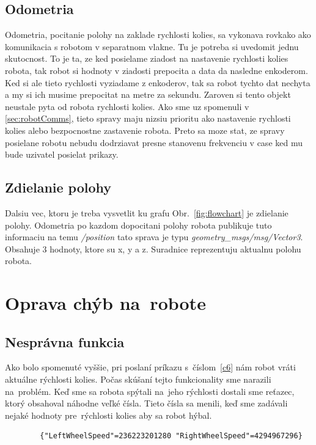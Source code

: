 \subsection{Odometria}
\label{sec:odometria}

Odometria, pocitanie polohy na zaklade rychlosti kolies, sa vykonava rovkako ako komunikacia s robotom v separatnom vlakne. Tu je potreba si uvedomit
jednu skutocnost. To je ta, ze ked posielame ziadost na nastavenie rychlosti kolies robota, tak robot si hodnoty v ziadosti prepocita a data da nasledne
enkoderom. Ked si ale tieto rychlosti vyziadame z enkoderov, tak sa robot tychto dat nechyta a my si ich musime prepocitat na metre za sekundu. Zaroven
si tento objekt neustale pyta od robota rychlosti kolies. Ako sme uz spomenuli v \ref{sec:robotComms}, tieto spravy maju nizsiu prioritu ako nastavenie
rychlosti kolies alebo bezpocnostne zastavenie robota. Preto sa moze stat, ze spravy posielane robotu nebudu dodrziavat presne stanovenu frekvenciu v case
ked mu bude uzivatel posielat prikazy.

\subsection{Zdielanie polohy}
\label{sec:zdielanie_polohy}

Dalsiu vec, ktoru je treba vysvetlit ku grafu Obr.~\ref{fig:flowchart} je zdielanie polohy. Odometria po kazdom dopocitani polohy robota publikuje tuto
informaciu na temu \textit{/position} tato sprava je typu \textit{geometry\_msgs/msg/Vector3}. Obsahuje 3 hodnoty, ktore su x, y a z.
Suradnice reprezentuju aktualnu polohu robota.

\section{Oprava chýb na~robote}

\subsection{Nesprávna funkcia}

Ako bolo spomenuté vyššie, pri poslaní príkazu s~číslom~\ref{c6} nám robot vráti aktuálne rýchlosti kolies. Počas skúšaní tejto funkcionality
sme narazili na~problém. Keď sme sa robota spýtali na~jeho rýchlosti dostali sme reťazec, ktorý obsahoval náhodne veľké čísla. Tieto čísla sa
menili, keď sme zadávali nejaké hodnoty pre~rýchlosti kolies aby sa robot hýbal.

\label{jsonWannabeSpeed}
\begin{lstlisting}
		{"LeftWheelSpeed"=236223201280 "RightWheelSpeed"=4294967296}
\end{lstlisting}

